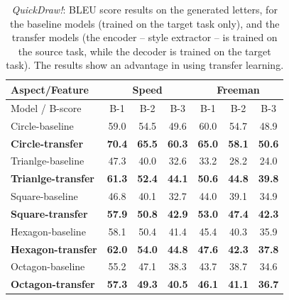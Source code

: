         \begin{table}[!htbp]
          \centering
          \begin{tabular}{l c c c|c c c}
            \hline
            \multicolumn{1}{l}{Aspect/Feature} & \multicolumn{3}{c}{ Speed } & \multicolumn{3}{c}{ Freeman }   \\ \hline
            Model / B-score      & B-1  & B-2  & B-3           & B-1  & B-2   & B-3              \\ \hline
            Circle-baseline &    59.0 & 54.5 & 49.6 & 60.0 & 54.7 & 48.9 \\%
            \textbf{Circle-transfer} &    \textbf{70.4} & \textbf{65.5} & \textbf{60.3} & \textbf{65.0} & \textbf{58.1} & \textbf{50.6} \\%

            Trianlge-baseline &  47.3 & 40.0 & 32.6 & 33.2 & 28.2 & 24.0  \\%
            \textbf{Trianlge-transfer} &  \textbf{61.3} & \textbf{52.4} & \textbf{44.1} & \textbf{50.6} & \textbf{44.8} & \textbf{39.8}  \\%

            Square-baseline &    46.8 & 40.1 & 32.7 & 44.0 & 39.1 & 34.9  \\%
            \textbf{Square-transfer} &    \textbf{57.9} & \textbf{50.8} & \textbf{42.9} & \textbf{53.0} & \textbf{47.4} & \textbf{42.3} \\%

            Hexagon-baseline &   58.1 & 50.4 & 41.4 & 45.4 & 40.3 & 35.9   \\%
            \textbf{Hexagon-transfer} &   \textbf{62.0} & \textbf{54.0} & \textbf{44.8} & \textbf{47.6} & \textbf{42.3} & \textbf{37.8}  \\%

            Octagon-baseline &   55.2 & 47.1 & 38.3 & 43.7 & 38.7 & 34.6   \\%
            \textbf{Octagon-transfer} &   \textbf{57.3} & \textbf{49.3} & \textbf{40.5} & \textbf{46.1} & \textbf{41.1} & \textbf{36.7}  \\\hline

          \end{tabular}
          \caption{\textit{QuickDraw!}: BLEU score results on the generated letters, for the baseline models (trained on the target task only), and the transfer models (the encoder -- style extractor -- is trained on the source task, while the decoder is trained on the target task). The results show an advantage in using transfer learning.}
          \label{table:bleu_score_quickdraw_transfer}
        \end{table}

